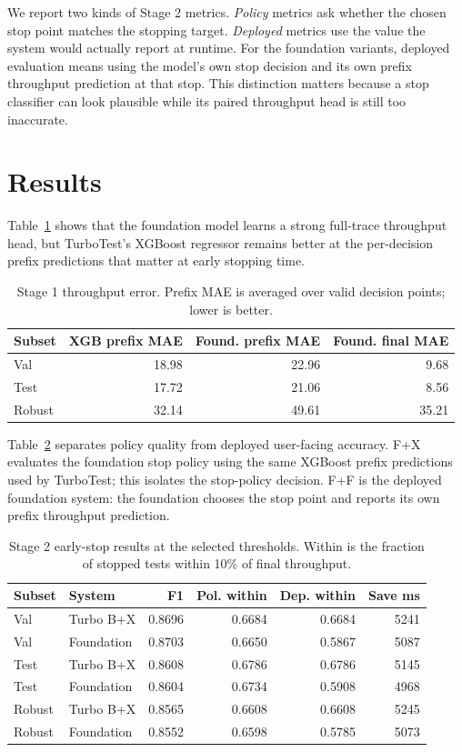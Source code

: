 \documentclass[10pt,twocolumn]{article}
\begin{document}
We report two kinds of Stage 2 metrics. \emph{Policy} metrics ask whether the chosen stop point matches the stopping target. \emph{Deployed} metrics use the value the system would actually report at runtime. For the foundation variants, deployed evaluation means using the model's own stop decision and its own prefix throughput prediction at that stop. This distinction matters because a stop classifier can look plausible while its paired throughput head is still too inaccurate.

\section{Results}
Table~\ref{tab:stage1} shows that the foundation model learns a strong full-trace throughput head, but TurboTest's XGBoost regressor remains better at the per-decision prefix predictions that matter at early stopping time.

\begin{table}[t]
\caption{Stage 1 throughput error. Prefix MAE is averaged over valid decision points; lower is better.}
\label{tab:stage1}
\scriptsize
\begin{tabularx}{\linewidth}{lrrr}
\toprule
Subset & XGB prefix MAE & Found. prefix MAE & Found. final MAE \\
\midrule
Val & 18.98 & 22.96 & 9.68 \\
Test & 17.72 & 21.06 & 8.56 \\
Robust & 32.14 & 49.61 & 35.21 \\
\bottomrule
\end{tabularx}
\end{table}

Table~\ref{tab:stage2} separates policy quality from deployed user-facing accuracy. F+X evaluates the foundation stop policy using the same XGBoost prefix predictions used by TurboTest; this isolates the stop-policy decision. F+F is the deployed foundation system: the foundation chooses the stop point and reports its own prefix throughput prediction.

\begin{table}[t]
\caption{Stage 2 early-stop results at the selected thresholds. Within is the fraction of stopped tests within 10\% of final throughput.}
\label{tab:stage2}
\scriptsize
\begin{tabularx}{\linewidth}{@{}llrrrr@{}}
\toprule
Subset & System & F1 & Pol. within & Dep. within & Save ms \\
\midrule
Val & Turbo B+X & 0.8696 & 0.6684 & 0.6684 & 5241 \\
Val & Foundation & 0.8703 & 0.6650 & 0.5867 & 5087 \\
Test & Turbo B+X & 0.8608 & 0.6786 & 0.6786 & 5145 \\
Test & Foundation & 0.8604 & 0.6734 & 0.5908 & 4968 \\
Robust & Turbo B+X & 0.8565 & 0.6608 & 0.6608 & 5245 \\
Robust & Foundation & 0.8552 & 0.6598 & 0.5785 & 5073 \\
\bottomrule
\end{tabularx}
\end{table}
\end{document}
